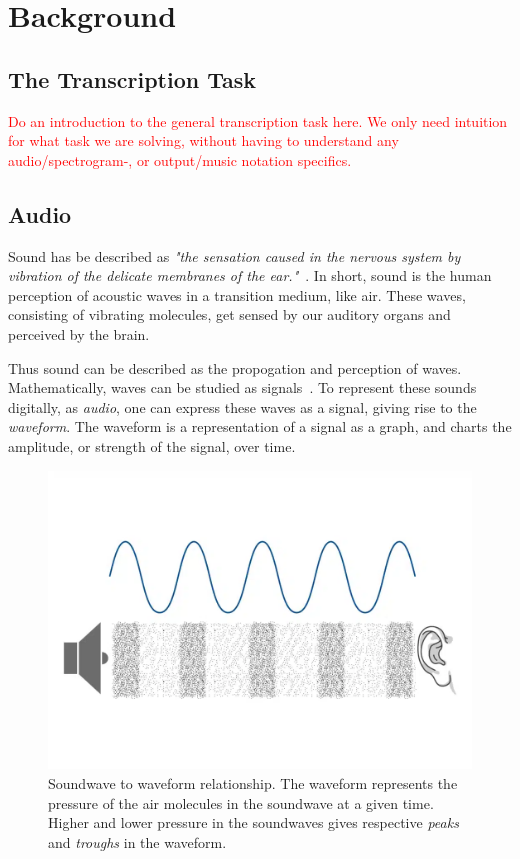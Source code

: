 \chapter{Background}\label{Background}

\section{The Transcription Task}

\textcolor{red}{Do an introduction to the general transcription task here. We only need intuition for what task we are solving, without having to understand any audio/spectrogram-, or output/music notation specifics.}

\section{Audio}

Sound has be described as \textit{"the sensation caused in the nervous system by vibration of the delicate membranes of the ear."}~\cite{1953fundamentals}. In short, sound is the human perception of acoustic waves in a transition medium, like air. These waves, consisting of vibrating molecules, get sensed by our auditory organs and perceived by the brain. 

Thus sound can be described as the propogation and perception of waves. Mathematically, waves can be studied as signals~\cite{8454362}. To represent these sounds digitally, as \textit{audio}, one can express these waves as a signal, giving rise to the \textit{waveform}. The waveform is a representation of a signal as a graph, and charts the amplitude, or strength of the signal, over time.

\begin{figure}[H]
    \centering
    \includegraphics[scale=0.35]{figures/waveform}
    \caption{Soundwave to waveform relationship. The waveform represents the pressure of the air molecules in the soundwave at a given time. Higher and lower pressure in the soundwaves gives respective \textit{peaks} and \textit{troughs} in the waveform.}
    \label{WaveformFigure}
\end{figure}

